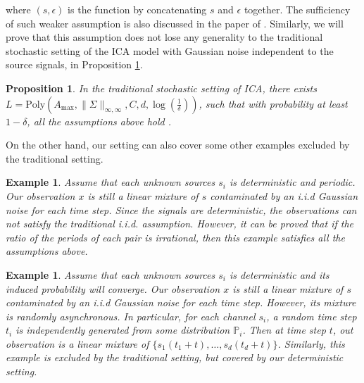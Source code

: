 \documentclass[twoside]{article}
\newtheorem{example}[lemma]{Example}
\newtheorem{prop}[lemma]{Proposition}
\theoremstyle{definition}
\begin{document}
 where $(s,\epsilon)$ is the function by concatenating $s$ and $\epsilon$ together.  
The sufficiency of such weaker assumption is also discussed in the paper of \citet{frieze1996learning}.
Similarly, we will prove that this assumption does not lose any generality to the traditional stochastic setting of the ICA model with Gaussian noise independent to the source signals, in Proposition \ref{prop:stochasticAss}. 
\begin{prop}
\label{prop:stochasticAss}
In the traditional stochastic setting of ICA, there exists $L = \text{Poly}(A_{\max}, \|\Sigma\|_{\infty,\infty}, C, d, \log(\frac{1}{\delta}))$, such that with probability at least $1-\delta$, all the assumptions above hold .
\end{prop}
On the other hand, our setting can also cover some other examples excluded by the traditional setting. 
\begin{example}
Assume that each unknown sources $s_i$ is deterministic and periodic. Our observation $x$ is still a linear mixture of $s$ contaminated by an i.i.d Gaussian noise for each time step. 
Since the signals are deterministic, the observations can not satisfy the traditional i.i.d. assumption. However, it can be proved that if the ratio of the periods of each pair is irrational, then this example satisfies all the assumptions above.   
\end{example}
\begin{example}
Assume that each unknown sources $s_i$ is deterministic and its induced probability will converge. 
Our observation $x$ is still a linear mixture of $s$ contaminated by an i.i.d Gaussian noise for each time step. 
However, its mixture is randomly asynchronous. 
In particular, for each channel $s_i$, a random time step $t_i$ is independently generated from some distribution $\mathbb{P}_i$. 
Then at time step $t$, out observation is a linear mixture of $\{s_1(t_1+t), \ldots, s_d(t_d+t)\}$. 
Similarly, this example is excluded by the traditional setting, but covered by our deterministic setting.
\end{example}

 
\end{document}
